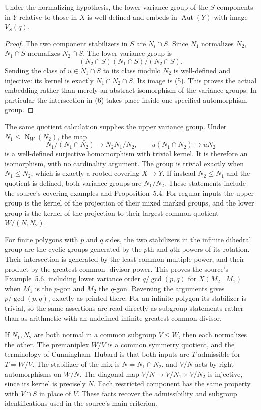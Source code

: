 \documentclass[a4paper,11pt]{article}
\newcommand{\Norm}{\operatorname{N}}
\newcommand{\Aut}{\operatorname{Aut}}
\begin{document}
\begin{lemma}\label{sections}
Under the normalizing hypothesis, the lower variance group of the
$S$-components in $Y$ relative to those in $X$ is well-defined and
embeds in $\Aut(Y)$ with image $V_S(q)$.
\end{lemma}
\begin{proof}
The two component stabilizers in $S$ are $N_i\cap S$. Since
$N_1$ normalizes $N_2$, $N_1\cap S$ normalizes $N_2\cap S$.
The lower variance group is
\[
 (N_2\cap S)(N_1\cap S)/(N_2\cap S).
\]
Sending the class of $u\in N_1\cap S$ to its class modulo $N_2$ is
well-defined and injective: its kernel is exactly $N_1\cap N_2\cap S$.
Its image is (5). This proves the actual embedding rather than merely
an abstract isomorphism of the variance groups. In particular the
intersection in (6) takes place inside one specified automorphism group.
\end{proof}

The same quotient calculation supplies the upper variance group. Under
$N_1\leq\Norm_W(N_2)$, the map
\[
 N_1/(N_1\cap N_2)\longrightarrow N_2N_1/N_2,
 \qquad u(N_1\cap N_2)\longmapsto uN_2
\]
is a well-defined surjective homomorphism with trivial kernel. It is
therefore an isomorphism, with no cardinality argument. The group is
trivial exactly when $N_1\leq N_2$, which is exactly a rooted covering
$X\to Y$. If instead $N_2\leq N_1$ and the quotient is defined, both
variance groups are $N_1/N_2$. These statements include the source's
covering examples and Proposition~5.4. For regular inputs the upper
group is the kernel of the projection of their mixed marked groups,
and the lower group is the kernel of the projection to their largest
common quotient $W/(N_1N_2)$.

For finite polygons with $p$ and $q$ sides, the two stabilizers in the
infinite dihedral group are the cyclic groups generated by the $p$th
and $q$th powers of its rotation. Their intersection is generated by the
least-common-multiple power, and their product by the greatest-common-
divisor power. This proves the source's Example~5.6, including lower
variance order $q/\gcd(p,q)$ for $X(M_2\mid M_1)$ when $M_1$ is the
$p$-gon and $M_2$ the $q$-gon. Reversing the arguments gives
$p/\gcd(p,q)$, exactly as printed there. For an infinite polygon its stabilizer is trivial,
so the same assertions are read directly as subgroup statements rather
than as arithmetic with an undefined infinite greatest common divisor.

If $N_1,N_2$ are both normal in a common subgroup $V\leq W$, then
each normalizes the other. The premaniplex $W/V$ is a common symmetry
quotient, and the terminology of Cunningham--Hubard is that both inputs
are $T$-admissible for $T=W/V$. The stabilizer of the mix is
$N=N_1\cap N_2$, and $V/N$ acts by right automorphisms on $W/N$.
The diagonal map $V/N\to V/N_1\times V/N_2$ is injective, since its
kernel is precisely $N$. Each restricted component has the same property
with $V\cap S$ in place of $V$. These facts recover the admissibility
and subgroup identifications used in the source's main criterion.
\end{document}
